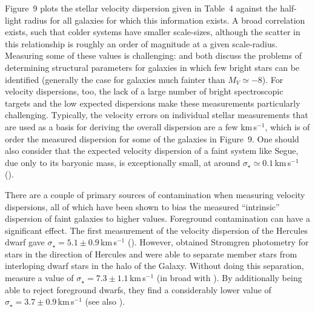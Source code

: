 \documentclass[manuscript]{aastex}
\begin{document}
Figure~9 plots the stellar velocity dispersion given in Table~4
against the half-light radius for all galaxies for which this
information exists. A broad correlation exists, such that colder
systems have smaller scale-sizes, although the scatter in this
relationship is roughly an order of magnitude at a given
scale-radius. Measuring some of these values is challenging:
\cite{martin2008a} and \cite{munoz2012} both discuss the problems of
determining structural parameters for galaxies in which few
bright stars can be identified (generally the case for galaxies much
fainter than $M_V \simeq -8$). For velocity dispersions, too, the lack
of a large number of bright spectroscopic targets and the low expected
dispersions make these measurements particularly
challenging. Typically, the velocity errors on individual stellar
measurements that are used as a basis for deriving the overall
dispersion are a few km\,s$^{-1}$, which is of order the measured
dispersion for some of the galaxies in Figure~9. One should also
consider that the expected velocity dispersion of a faint system like
Segue, due only to its baryonic mass, is exceptionally small, at
around $\sigma_\star \simeq 0.1$\,km\,s$^{-1}$ (\citealt{mcconnachie2010a}).

There are a couple of primary sources of contamination when measuring
velocity dispersions, all of which have been shown to bias the
measured ``intrinsic'' dispersion of faint galaxies to higher
values. Foreground contamination can have a significant effect. The
first measurement of the velocity dispersion of the Hercules dwarf
gave $\sigma_\star = 5.1 \pm 0.9$\,km\,s$^{-1}$
(\citealt{simon2007}). However, \cite{aden2009a} obtained Stromgren
photometry for stars in the direction of Hercules and were able to
separate member stars from interloping dwarf stars in the halo of the
Galaxy. Without doing this separation, \cite{aden2009a} measure a
value of $\sigma_\star = 7.3 \pm 1.1$\,km\,s$^{-1}$ (in broad with \citealt{simon2007}). By additionally being able to
reject foreground dwarfs, they find a considerably lower value of
$\sigma_\star = 3.7 \pm 0.9$\,km\,s$^{-1}$ (see also
\citealt{aden2009b}). 
\end{document}
